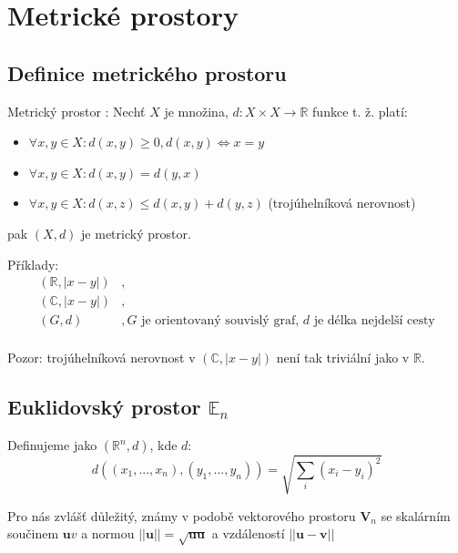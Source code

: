 \documentclass[../main.tex]{subfiles}
\begin{document}
\section{Metrické prostory}
\subsection{Definice metrického prostoru}
\hspace{1.2mm}
Metrický prostor : Nechť $X$ je množina,  $d: X \times X \rightarrow \mathbb{R}$ funkce t. ž. platí:

\begin{itemize}
\item{$\forall x,y \in X : d(x,y) \geq 0, d(x,y) \iff x = y$ }
\item{$\forall x,y \in X : d(x,y) = d(y,x)$}
\item{$\forall x,y \in X : d(x,z) \leq d(x,y) + d(y,z)$ (trojúhelníková nerovnost)}
\end{itemize}
pak $(X,d)$ je metrický prostor.

\noindent
\hspace{1.2mm}
Příklady:
\begin{align*} 
    (\mathbb{R}, |x-y|) &,\\
    (\mathbb{C},|x-y|) &,\\
    (G,d) &, G \text{ je orientovaný souvislý graf, } d \text{ je délka nejdelší cesty}\\
\end{align*}

\hspace{1.2mm}
Pozor: trojúhelníková nerovnost v $(\mathbb{C}, |x-y|)$ není tak triviální jako v $\mathbb{R}$.

\subsection{Euklidovský prostor $\mathbb{E}_n$}
\hspace{1.2mm}
Definujeme jako $(\mathbb{R}^n,d)$, kde $d$:
\[d((x_1,...,x_n),(y_1,...,y_n)) = \sqrt{\sum_i(x_i-y_i)^2}\]

Pro nás zvlášť důležitý, známy v podobě vektorového prostoru $\textbf{V}_n$ se skalárním součinem $\textbf{u}v$ a normou
$||\textbf{u}|| = \sqrt{\textbf{uu}}$ a vzdáleností $||\textbf{u}-\textbf{v}||$
\noindent
\end{document}
